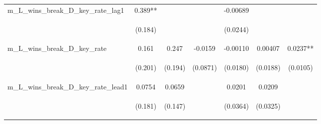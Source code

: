 \begin{tabular}{lcccccc}
m\_L\_wins\_break\_D\_key\_rate\_lag1 & 0.389** &  &  & -0.00689 &  &  \\
\vspace{4pt} & \begin{footnotesize}(0.184)\end{footnotesize} & \begin{footnotesize}\end{footnotesize} & \begin{footnotesize}\end{footnotesize} & \begin{footnotesize}(0.0244)\end{footnotesize} & \begin{footnotesize}\end{footnotesize} & \begin{footnotesize}\end{footnotesize} \\
m\_L\_wins\_break\_D\_key\_rate & 0.161 & 0.247 & -0.0159 & -0.00110 & 0.00407 & 0.0237** \\
\vspace{4pt} & \begin{footnotesize}(0.201)\end{footnotesize} & \begin{footnotesize}(0.194)\end{footnotesize} & \begin{footnotesize}(0.0871)\end{footnotesize} & \begin{footnotesize}(0.0180)\end{footnotesize} & \begin{footnotesize}(0.0188)\end{footnotesize} & \begin{footnotesize}(0.0105)\end{footnotesize} \\
m\_L\_wins\_break\_D\_key\_rate\_lead1 & 0.0754 & 0.0659 &  & 0.0201 & 0.0209 &  \\
\vspace{4pt} & \begin{footnotesize}(0.181)\end{footnotesize} & \begin{footnotesize}(0.147)\end{footnotesize} & \begin{footnotesize}\end{footnotesize} & \begin{footnotesize}(0.0364)\end{footnotesize} & \begin{footnotesize}(0.0325)\end{footnotesize} & \begin{footnotesize}\end{footnotesize} \\

\end{tabular}
